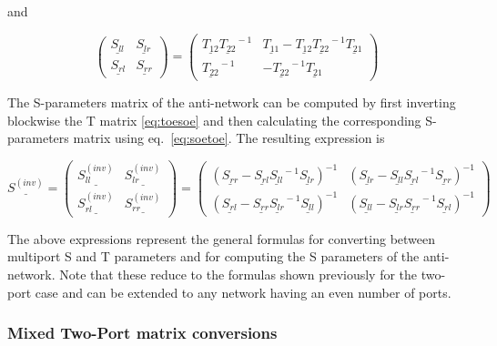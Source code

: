 and

\begin{equation}
\label{eq:soetoe}
\begin{pmatrix}
\underline{S_{ll}} & \underline{S_{lr}}\\
\underline{S_{rl}} & \underline{S_{rr}}
\end{pmatrix}
=
\begin{pmatrix}
\underline{T_{12}}\underline{T_{22}}^{\!\!\!\!-1} & \underline{T_{11}} - \underline{T_{12}}\underline{T_{22}}^{\!\!\!\!-1}\underline{T_{21}}\\
\underline{T_{22}}^{\!\!\!\!-1} & - \underline{T_{22}}^{\!\!\!\!-1}\underline{T_{21}} 
\end{pmatrix}
\end{equation}

The S-parameters matrix of the anti-network can be computed by first inverting blockwise the T matrix \eqref{eq:toesoe} and then calculating the corresponding S-parameters matrix using eq.~\eqref{eq:soetoe}. The resulting expression is

\begin{equation}
\label{eq:sinvoe}
\underline{S^{(inv)}}
=
\begin{pmatrix}
\underline{S_{ll}^{(inv)}} & \underline{S_{lr}^{(inv)}}\\
\underline{S_{rl}^{(inv)}} & \underline{S_{rr}^{(inv)}}
\end{pmatrix}
=
\begin{pmatrix}
\left(\underline{S_{rr}} - \underline{S_{rl}}\underline{S_{ll}}^{\!\!\!\!-1}\underline{S_{lr}}\right)^{-1} & \left(\underline{S_{lr}} - \underline{S_{ll}}\underline{S_{rl}}^{\!\!\!\!-1}\underline{S_{rr}}\right)^{-1}\\
\left(\underline{S_{rl}} - \underline{S_{rr}}\underline{S_{lr}}^{\!\!\!\!-1}\underline{S_{ll}}\right)^{-1} & \left(\underline{S_{ll}} - \underline{S_{lr}}\underline{S_{rr}}^{\!\!\!\!-1}\underline{S_{rl}}\right)^{-1}
\end{pmatrix}
\end{equation}

The above expressions represent the general formulas for converting between multiport S and T parameters and for computing the S parameters of the anti-network. Note that these reduce to the formulas shown previously for the two-port case and can be extended to any network having an even number of ports.

\subsubsection{Mixed Two-Port matrix conversions}


